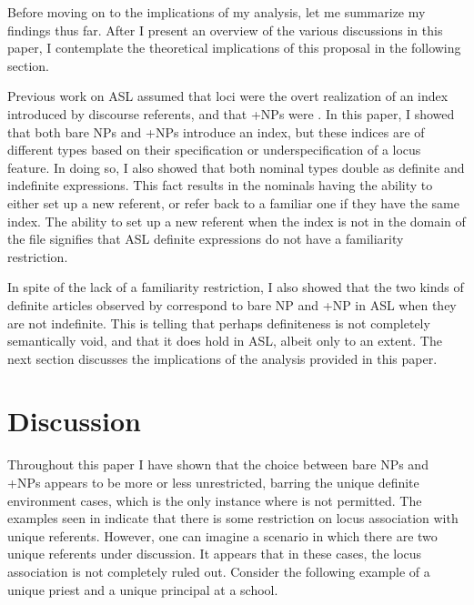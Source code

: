 \documentclass[output=paper,
modfonts
]{langscibook}
\begin{document}
Before moving on to the implications of my analysis, let me summarize my findings thus far. After I present an overview of the various discussions in this paper, I contemplate the theoretical implications of this proposal in the following section. 

Previous work on ASL assumed that loci were the overt realization of an index introduced by discourse referents, and that +NPs were . In this paper, I showed that both bare NPs and +NPs introduce an index, but these indices are of different types based on their specification or underspecification of a locus feature. In doing so, I also showed that both nominal types double as definite and indefinite expressions. This fact results in the nominals having the ability to either set up a new referent, or refer back to a familiar one if they have the same index. The ability to set up a new referent when the index is not in the domain of the file signifies that ASL definite expressions do not have a familiarity restriction. 

In spite of the lack of a familiarity restriction, I also showed that the two kinds of definite articles observed by \citet{Schwarz2009,Schwarz2013} correspond to bare NP and +NP in ASL when they are not indefinite. This is telling that perhaps definiteness is not completely semantically void, and that it does hold in ASL, albeit only to an extent. The next section discusses the implications of the analysis provided in this paper. 

\section{Discussion}\label{sec:irani:5}

Throughout this paper I have shown that the choice between bare NPs and +NPs appears to be more or less unrestricted, barring the unique definite environment cases, which is the only instance where  is not permitted. The examples seen in  indicate that there is some restriction on locus association with unique referents. However, one can imagine a scenario in which there are two unique referents under discussion. It appears that in these cases, the locus association is not completely ruled out. Consider the following example of a unique priest and a unique principal at a school. 
\end{document}
